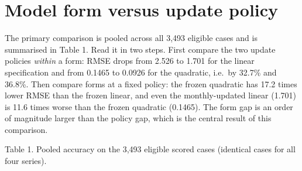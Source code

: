 \hypertarget{model-form-versus-update-policy}{%
\section{Model form versus update
policy}\label{model-form-versus-update-policy}}

The primary comparison is pooled across all 3,493 eligible cases and is
summarised in Table 1. Read it in two steps. First compare the two
update policies \emph{within} a form: RMSE drops from 2.526 to 1.701 for
the linear specification and from 0.1465 to 0.0926 for the quadratic,
i.e.~by 32.7\% and 36.8\%. Then compare forms at a fixed policy: the
frozen quadratic has 17.2 times lower RMSE than the frozen linear, and
even the monthly-updated linear (1.701) is 11.6 times worse than the
frozen quadratic (0.1465). The form gap is an order of magnitude larger
than the policy gap, which is the central result of this comparison.

Table 1. Pooled accuracy on the 3,493 eligible scored cases (identical
cases for all four series).

